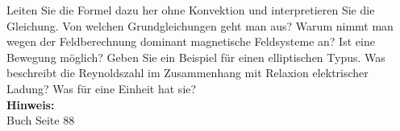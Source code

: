\begin{question}[section=3,subsection=33,name={Relaxion und Konvektion},difficulty=,type=mdl,tags={}]
	Leiten Sie die Formel dazu her ohne Konvektion und interpretieren Sie die Gleichung. Von welchen Grundgleichungen geht man aus? Warum nimmt man wegen der Feldberechnung dominant magnetische Feldsysteme an? Ist eine Bewegung möglich? Geben Sie ein Beispiel für einen elliptischen Typus. Was beschreibt die Reynoldszahl im Zusammenhang mit Relaxion elektrischer Ladung? Was für eine Einheit hat sie?
	\\ \textbf{Hinweis:}\\
	Buch Seite 88
\end{question}
\begin{solution}
	
\end{solution}
